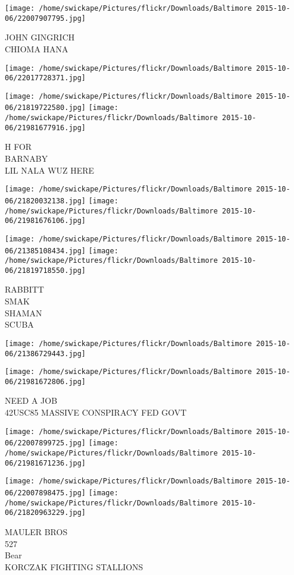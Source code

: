 \documentclass[10pt,letterpaper]{article}
\begin{document}
\vspace{0.25in}
\texttt{[image: /home/swickape/Pictures/flickr/Downloads/Baltimore 2015-10-06/22007907795.jpg]}

JOHN GINGRICH\\
CHIOMA HANA\\
\pagebreak

\texttt{[image: /home/swickape/Pictures/flickr/Downloads/Baltimore 2015-10-06/22017728371.jpg]}

\vspace{0.25in}
\texttt{[image: /home/swickape/Pictures/flickr/Downloads/Baltimore 2015-10-06/21819722580.jpg]}
\texttt{[image: /home/swickape/Pictures/flickr/Downloads/Baltimore 2015-10-06/21981677916.jpg]}

H FOR\\
BARNABY\\
LIL NALA WUZ HERE\\
\pagebreak

\texttt{[image: /home/swickape/Pictures/flickr/Downloads/Baltimore 2015-10-06/21820032138.jpg]}
\texttt{[image: /home/swickape/Pictures/flickr/Downloads/Baltimore 2015-10-06/21981676106.jpg]}

\texttt{[image: /home/swickape/Pictures/flickr/Downloads/Baltimore 2015-10-06/21385108434.jpg]}
\texttt{[image: /home/swickape/Pictures/flickr/Downloads/Baltimore 2015-10-06/21819718550.jpg]}

RABBITT\\
SMAK\\
SHAMAN\\
SCUBA\\
\pagebreak

\texttt{[image: /home/swickape/Pictures/flickr/Downloads/Baltimore 2015-10-06/21386729443.jpg]}

\vspace{0.25in}
\texttt{[image: /home/swickape/Pictures/flickr/Downloads/Baltimore 2015-10-06/21981672806.jpg]}

NEED A JOB\\
42USC85 MASSIVE CONSPIRACY FED GOVT\\
\pagebreak

\texttt{[image: /home/swickape/Pictures/flickr/Downloads/Baltimore 2015-10-06/22007899725.jpg]}
\texttt{[image: /home/swickape/Pictures/flickr/Downloads/Baltimore 2015-10-06/21981671236.jpg]}

\texttt{[image: /home/swickape/Pictures/flickr/Downloads/Baltimore 2015-10-06/22007898475.jpg]}
\texttt{[image: /home/swickape/Pictures/flickr/Downloads/Baltimore 2015-10-06/21820963229.jpg]}

MAULER BROS\\
527\\
Bear\\
KORCZAK FIGHTING STALLIONS\\
\pagebreak
\end{document}
